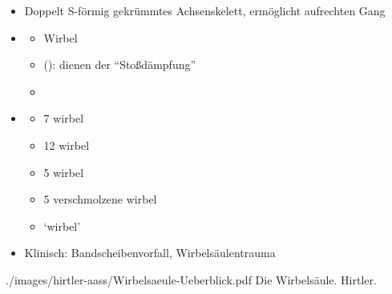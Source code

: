 {}{%
\begin{itemize}
  \item Doppelt S-förmig gekrümmtes
Achsenskelett, ermöglicht  aufrechten Gang 
\item {}
\begin{itemize}
    \item Wirbel 
    \item {}
    (): dienen der \protect\enquote{Stoßdämpfung}
    \item {}
\end{itemize}
\item {}
\begin{itemize}
    \item 7 wirbel\\
    \item 12 wirbel\\
    \item 5 wirbel\\
    \item 5 verschmolzene wirbel\\
     
    \item {}
    \protect\enquote*{wirbel}\\
     
\end{itemize}
\item Klinisch: Bandscheibenvorfall, Wirbelsäulentrauma
\end{itemize}

}
{./images/hirtler-aass/Wirbelsaeule-Ueberblick.pdf}
{Die Wirbelsäule.}
{Hirtler. }

